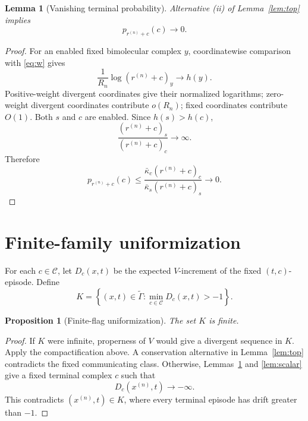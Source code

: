 \documentclass[11pt]{article}
\newtheorem{lemma}[theorem]{Lemma}
\newtheorem{proposition}[theorem]{Proposition}
\theoremstyle{definition}
\newcommand{\Ccal}{\mathcal C}
\newcommand{\wtG}{\widetilde\Gamma}
\newcommand{\ff}[2]{(#1)_{#2}}
\begin{document}
\begin{lemma}[Vanishing terminal probability]\label{lem:terminal}
Alternative (ii) of Lemma~\ref{lem:top} implies
\[
  p_{r^{(n)}+c}(c)\longrightarrow0.
\]
\end{lemma}

\begin{proof}
For an enabled fixed bimolecular complex \(y\), coordinatewise comparison
with \eqref{eq:w} gives
\begin{equation}\label{eq:falling-asymptotic}
  \frac{1}{R_n}\log\ff{r^{(n)}+c}{y}
  \longrightarrow h(y).
\end{equation}
Positive-weight divergent coordinates give their normalized logarithms;
zero-weight divergent coordinates contribute \(o(R_n)\); fixed coordinates
contribute \(O(1)\).  Both \(s\) and \(c\) are enabled.  Since
\(h(s)>h(c)\),
\[
  \frac{\ff{r^{(n)}+c}{s}}
       {\ff{r^{(n)}+c}{c}}
  \longrightarrow\infty.
\]
Therefore
\[
 p_{r^{(n)}+c}(c)
 \leq
 \frac{\bar\kappa_c\ff{r^{(n)}+c}{c}}
      {\bar\kappa_s\ff{r^{(n)}+c}{s}}
 \longrightarrow0.
\]
\end{proof}

\section{Finite-family uniformization}

For each \(c\in\Ccal\), let \(D_c(x,t)\) be the expected \(V\)-increment of
the fixed \((t,c)\)-episode.  Define
\begin{equation}\label{eq:K}
  K=\left\{(x,t)\in\wtG:
       \min_{c\in\Ccal}D_c(x,t)>-1\right\}.
\end{equation}

\begin{proposition}[Finite-flag uniformization]\label{prop:uniform}
The set \(K\) is finite.
\end{proposition}

\begin{proof}
If \(K\) were infinite, properness of \(V\) would give a divergent sequence
in \(K\).  Apply the compactification above.  A conservation alternative in
Lemma~\ref{lem:top} contradicts the fixed communicating class.  Otherwise,
Lemmas~\ref{lem:terminal} and \ref{lem:scalar} give a fixed terminal complex
\(c\) such that
\[
  D_c(x^{(n)},t)\longrightarrow-\infty.
\]
This contradicts \((x^{(n)},t)\in K\), where every terminal episode has drift
greater than \(-1\).
\end{proof}
\end{document}
